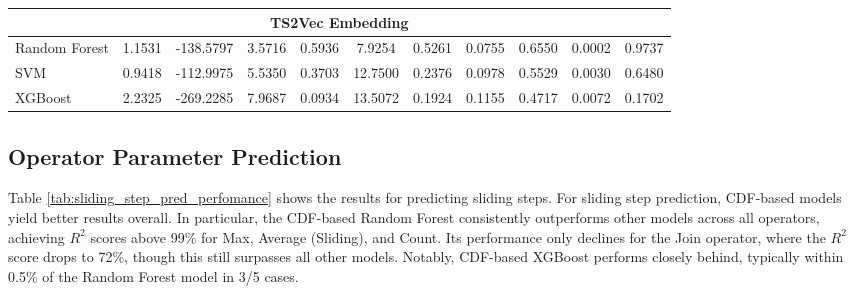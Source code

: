 \begin{appendices}
\begin{table}
\begin{tabular}{lcccccccccc}
\multicolumn{11}{c}{\textbf{TS2Vec Embedding}}                                                                                                                                                                                                                                                                            \\ \hline
Random Forest                                                                                                          & 1.1531           & -138.5797      & 3.5716          & 0.5936         & 7.9254              & 0.5261             & 0.0755                & 0.6550              & 0.0002           & 0.9737          \\
SVM                                                                                                                    & 0.9418           & -112.9975      & 5.5350          & 0.3703         & 12.7500             & 0.2376             & 0.0978                & 0.5529              & 0.0030           & 0.6480          \\
XGBoost                                                                                                                & 2.2325           & -269.2285      & 7.9687          & 0.0934         & 13.5072             & 0.1924             & 0.1155                & 0.4717              & 0.0072           & 0.1702          \\ \hline
\end{tabular}
\end{table}

\subsection{Operator Parameter Prediction}
Table \ref{tab:sliding_step_pred_perfomance} shows the results for predicting sliding steps. For sliding step prediction, CDF-based models yield better results overall. In particular, the CDF-based Random Forest consistently outperforms other models across all operators, achieving $R^2$ scores above 99\% for Max, Average (Sliding), and Count. Its performance only declines for the Join operator, where the $R^2$ score drops to 72\%, though this still surpasses all other models. Notably, CDF-based XGBoost performs closely behind, typically within 0.5\% of the Random Forest model in 3/5 cases.




\end{appendices}
